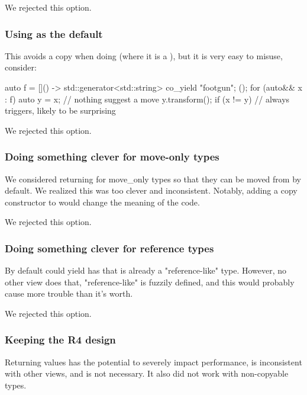 \documentclass{wg21}
\begin{document}
We rejected this option.

\subsubsection{Using  as the default}

This avoids a copy when doing  (where it is a ),
but it is very easy to misuse, consider:

\begin{colorblock}
auto f = []() -> std::generator<std::string> { co_yield "footgun"; }();
for (auto&& x : f) {
    auto y = x; // nothing suggest a move
    y.transform();
    if (x != y) {
        // always triggers, likely to be surprising
    }
}
\end{colorblock}

We rejected this option.


\subsubsection{Doing something clever for move-only types}

We considered returning  for move_only types so that they can be moved from by default.
We realized this was too clever and inconsistent.
Notably, adding a copy constructor to  would change the meaning of the code.

We rejected this option.

\subsubsection{Doing something clever for reference types}

By default  could yield  has that is already a "reference-like" type.
However, no other view does that, "reference-like" is fuzzily defined, and this would probably cause more trouble than it's worth.

We rejected this option.

\subsubsection{Keeping the R4 design}

Returning values has the potential to severely impact performance, is inconsistent with other views, and is not necessary.
It also did not work with non-copyable types.
\end{document}
